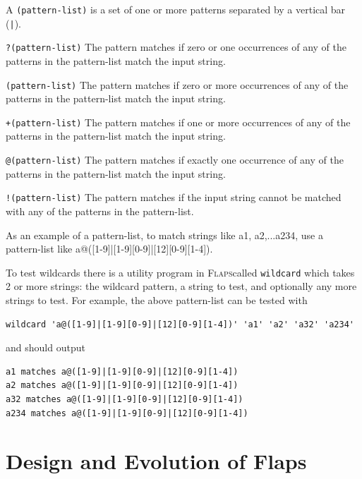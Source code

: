 \documentclass[11pt,openany,twoside]{book}
\numberwithin{equation}{section}		%
\newcommand{\Code}[1]{{\small\tt #1}}
\newcommand{\Flaps}{\textsc{Flaps\:}}
\begin{document}
A \Code{(pattern-list)} is a set of one or more patterns separated by
a vertical bar (\verb+|+).

	\begin{description}
       \item{\Code{?(pattern-list)}}
              The pattern matches if zero or one occurrences of any of  the
              patterns in the pattern-list match the input string.

       \item{\Code{*(pattern-list)}}
              The  pattern matches if zero or more occurrences of any of the
              patterns in the pattern-list match the input string.

       \item{\Code{+(pattern-list)}}
              The pattern matches if one or more occurrences of any of  the
              patterns in the pattern-list match the input string.

       \item{\Code{@(pattern-list)}}
              The  pattern  matches  if exactly one occurrence of any of the
              patterns in the pattern-list match the input string.

       \item{\Code{!(pattern-list)}}
              The pattern matches if the input string cannot be matched with any
              of the patterns in the pattern-list.
	\end{description}
As an example of a pattern-list, to match strings like a1, a2,...a234,
use a pattern-list like a@([1-9]|[1-9][0-9]|[12][0-9][1-4]).

To test wildcards there is a utility program in \Flaps called \Code{wildcard}
which takes 2 or more strings: the wildcard pattern, a string to test,
and optionally any more strings to test. For example, the above pattern-list
can be tested with
\begin{lstlisting}
wildcard 'a@([1-9]|[1-9][0-9]|[12][0-9][1-4])' 'a1' 'a2' 'a32' 'a234'
\end{lstlisting}
and should output
\begin{lstlisting}
a1 matches a@([1-9]|[1-9][0-9]|[12][0-9][1-4])
a2 matches a@([1-9]|[1-9][0-9]|[12][0-9][1-4])
a32 matches a@([1-9]|[1-9][0-9]|[12][0-9][1-4])
a234 matches a@([1-9]|[1-9][0-9]|[12][0-9][1-4])
\end{lstlisting}
	
\newpage
\section{Design and Evolution of Flaps}\label{sect:design}
\end{document}

